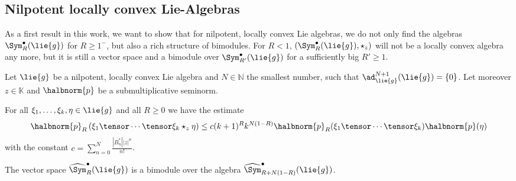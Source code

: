 \documentclass[
11pt,                          %
english                        %
]{article}
\begin{document}
\subsection{Nilpotent locally convex Lie-Algebras}
As a first result in this work, we want to show that for nilpotent, locally convex 
Lie algebras, we do not only find the algebras $\Sym_R^{\bullet}(\lie{g})$ for 
$R \geq 1^-$, but also a rich structure of bimodules. For $R < 1$, 
$\left( \Sym_R^{\bullet}(\lie{g}), \star_z \right)$ will not be a locally convex 
algebra any more, but it is still a vector space and a bimodule over 
$\Sym_{R'}^{\bullet}(\lie{g})$ for a sufficiently big $R' \geq 1$.
\begin{proposition}
	\label{prop:bimodules}
	Let $\lie{g}$ be a nilpotent, locally convex Lie algebra and $N \in \mathbb{N}$ 
	the smallest number, such that $\ad_{\lie{g}}^{N+1}(\lie{g}) = \{ 0 \}$. Let 
	moreover $z \in \mathbb{K}$ and $\halbnorm{p}$ be a submultiplicative seminorm.
	\begin{propositionlist}
		\item
		For all $\xi_1, \ldots, \xi_k, \eta \in \lie{g}$ and all $R \geq 0$ we have 
		the estimate
		\begin{equation}
			\halbnorm{p}_R
			\left(
				\xi_1 \tensor \cdots \tensor \xi_k \star_z \eta
			\right)
			\leq
			c (k+1)^R k^{N(1-R)}
			\halbnorm{p}_R(\xi_1 \tensor \cdots \tensor \xi_k)
			\halbnorm{p}(\eta)
		\end{equation}
		with the constant $c = \sum_{n = 0}^N \frac{|B_n^*| |z|^n}{n!}$.
		
		\item
		The vector space $\widehat{\Sym}_R^{\bullet}(\lie{g})$ is a bimodule over 
		the algebra $\widehat{\Sym}_{R + N(1-R)}^{\bullet}(\lie{g})$.
	\end{propositionlist}
\end{proposition}
\end{document}

